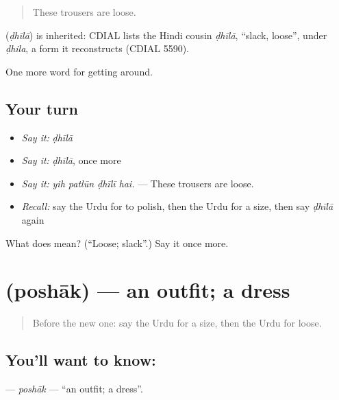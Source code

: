 \begin{quote}
These trousers are loose.
\end{quote}

\begin{cousinweb}
\textbf{} (\emph{ḍhīlā}) is inherited: CDIAL lists the Hindi cousin \emph{ḍhīlā}, \textquotedblleft{}slack, loose\textquotedblright{}, under \emph{ḍhila}, a form it reconstructs (CDIAL 5590).
\end{cousinweb}

\begin{grammarlens}[title={What you've built}]
One more word for getting around.
\end{grammarlens}

\subsection*{Your turn}
\begin{itemize}
\raggedright
  \item \emph{Say it:} \emph{ḍhīlā}
  \item \emph{Say it:} \emph{ḍhīlā}, once more
  \item \emph{Say it:} \emph{yih patlūn ḍhīlī hai.} — These trousers are loose.
  \item \emph{Recall:} say the Urdu for to polish, then the Urdu for a size, then say \emph{ḍhīlā} again
\end{itemize}

\begin{tcolorbox}[breakable,colback=teal!4,colframe=teal!35!black,title={Before you move on}]
What does  mean? (\textquotedblleft{}Loose; slack\textquotedblright{}.) Say it once more.
\end{tcolorbox}
\section[\texorpdfstring{\ur{پوشاک} (poshāk)}{پوشاک (poshāk)}]{ (poshāk) — an outfit; a dress}

\label{lesson:UR-C427-poshak}



\begin{quote}
Before the new one: say the Urdu for a size, then the Urdu for loose.
\end{quote}

\subsection*{You'll want to know: }
\textbf{} — \emph{poshāk} — \textquotedblleft{}an outfit; a dress\textquotedblright{}.

